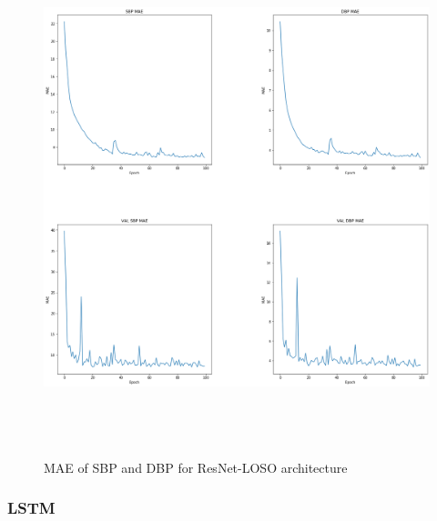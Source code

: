 \begin{figure}[H]
    \centering
    \includegraphics[width=15cm,height=15cm,keepaspectratio]{Results/slapnicar.png}
    \caption{MAE of SBP and DBP for ResNet-LOSO architecture}
    \label{resnetLosoResults}
\end{figure}


\subsubsection{LSTM}

